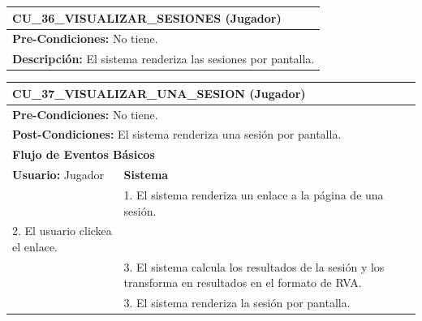 \begin{center}
  \begin{tabular}{| p{7.5cm} | p{7.5cm} |}
    \hline
    \multicolumn{2}{|p{15cm}|}{\textbf{CU\_36\_VISUALIZAR\_SESIONES} (Jugador)} \\ \hline
    \multicolumn{2}{|p{15cm}|}{\textbf{Pre-Condiciones:} No tiene.} \\ \hline
    \multicolumn{2}{|p{15cm}|}{\textbf{Descripción:} El sistema renderiza las sesiones por pantalla.} \\
    \hline
  \end{tabular}
  
  \label{table:usecase:36}
\end{center}

\begin{center}
  \begin{tabular}{| p{7.5cm} | p{7.5cm} |}
    \hline
    \multicolumn{2}{|p{15cm}|}{\textbf{CU\_37\_VISUALIZAR\_UNA\_SESION} (Jugador)} \\ \hline
    \multicolumn{2}{|p{15cm}|}{\textbf{Pre-Condiciones:} No tiene.} \\ \hline
    \multicolumn{2}{|p{15cm}|}{\textbf{Post-Condiciones:} El sistema renderiza una sesión por pantalla.} \\ \hline
    \multicolumn{2}{|p{7.5cm}|}{\textbf{Flujo de Eventos Básicos}} \\ \hline
    \multicolumn{1}{|p{7.5cm}|}{\textbf{Usuario:} Jugador} & \multicolumn{1}{|p{7.5cm}|}{\textbf{Sistema}} \\ \hline
    
    \multicolumn{1}{|p{7.5cm}|}{} & 
    \multicolumn{1}{|p{7.5cm}|}{1. El sistema renderiza un enlace a la página de una sesión.}\\ \hline
    
    \multicolumn{1}{|p{7.5cm}|}{2. El usuario clickea el enlace.}& 
    \multicolumn{1}{|p{7.5cm}|}{}\\ \hline
    
    \multicolumn{1}{|p{7.5cm}|}{} & 
    \multicolumn{1}{|p{7.5cm}|}{3. El sistema calcula los resultados de la sesión y los transforma en resultados en el formato de RVA.}\\ \hline
    
    \multicolumn{1}{|p{7.5cm}|}{} & 
    \multicolumn{1}{|p{7.5cm}|}{3. El sistema renderiza la sesión por pantalla.}\\ \hline
  \end{tabular}
  
  \label{table:usecase:37}
\end{center}

